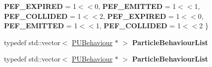 \begin{DoxyCompactItemize}
{\bfseries P\+E\+F\+\_\+\+E\+X\+P\+I\+R\+ED} = 1$<$$<$0, 
{\bfseries P\+E\+F\+\_\+\+E\+M\+I\+T\+T\+ED} = 1$<$$<$1, 
{\bfseries P\+E\+F\+\_\+\+C\+O\+L\+L\+I\+D\+ED} = 1$<$$<$2, 
{\bfseries P\+E\+F\+\_\+\+E\+X\+P\+I\+R\+ED} = 1$<$$<$0, 
\newline
{\bfseries P\+E\+F\+\_\+\+E\+M\+I\+T\+T\+ED} = 1$<$$<$1, 
{\bfseries P\+E\+F\+\_\+\+C\+O\+L\+L\+I\+D\+ED} = 1$<$$<$2
 \}
\item 
\mbox{\label{structPUParticle3D_a8190f20eba8b1e3bb9de481d7136e8f6}} 
typedef std\+::vector$<$ \hyperlink{classPUBehaviour}{P\+U\+Behaviour} $\ast$ $>$ {\bfseries Particle\+Behaviour\+List}
\item 
\mbox{\label{structPUParticle3D_a8190f20eba8b1e3bb9de481d7136e8f6}} 
typedef std\+::vector$<$ \hyperlink{classPUBehaviour}{P\+U\+Behaviour} $\ast$ $>$ {\bfseries Particle\+Behaviour\+List}
\end{DoxyCompactItemize}
